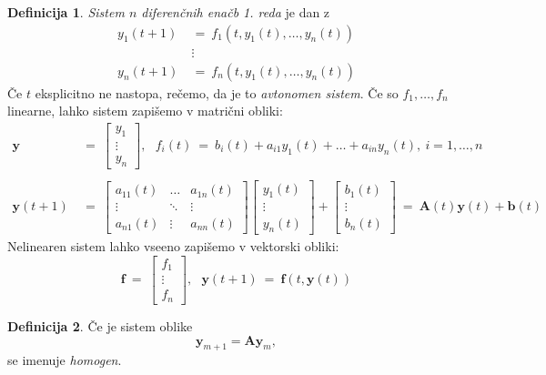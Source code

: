 \documentclass[11pt]{article}
\renewcommand{\b}{\mathbf{b}}
\newcommand{\f}{\mathbf{f}}
\newcommand{\y}{\mathbf{y}}
\newcommand{\A}{\mathbf{A}}
\theoremstyle{definition}
\newtheorem{definicija}{Definicija}[section]
\theoremstyle{definition}
\theoremstyle{definition}
\theoremstyle{definition}
\begin{document}
\begin{definicija}

\textit{Sistem $n$ diferenčnih enačb 1. reda} je dan z
\begin{align*}
y_1(t+1) ~&=~ f_1(t,y_1(t),\ldots,y_n(t)) \\
&\vdots \\
y_n(t+1) ~&=~ f_n(t,y_1(t),\ldots,y_n(t))
\end{align*} 
Če $t$ eksplicitno ne nastopa, rečemo, da je to \textit{avtonomen sistem}. Če so $f_1,\ldots,f_n$ linearne, lahko sistem zapišemo v matrični obliki:
\begin{align*}
\y ~&=~ \begin{bmatrix}
y_1 \\
\vdots \\
y_n
\end{bmatrix},~~~ f_i(t) ~=~ b_i(t) + a_{i1}y_1(t) + \ldots + a_{in}y_n(t), ~i = 1,\ldots, n\\ \\
\y(t+1) ~&=~ \begin{bmatrix}
a_{11}(t) & \ldots & a_{1n}(t) \\
\vdots & \ddots & \vdots \\
a_{n1}(t) & \vdots & a_{nn}(t)
\end{bmatrix} \begin{bmatrix}
y_1(t) \\
\vdots \\
y_n(t) 
\end{bmatrix} + \begin{bmatrix}
b_1(t) \\
\vdots \\
b_n(t)
\end{bmatrix} ~=~ \A(t)\y(t) + \b(t)
\end{align*}
Nelinearen sistem lahko vseeno zapišemo v vektorski obliki:
$$\f ~=~ \begin{bmatrix}
f_1 \\
\vdots \\
f_n
\end{bmatrix}, ~~~ \y(t+1) ~=~ \f(t, \y(t))$$

\end{definicija}
\vspace{0.5cm}

\begin{definicija}

Če je sistem oblike
$$\y_{m+1} = \A\y_m,$$
se imenuje \textit{homogen}.

\end{definicija}
\vspace{0.5cm}

\pagebreak


\end{document}
